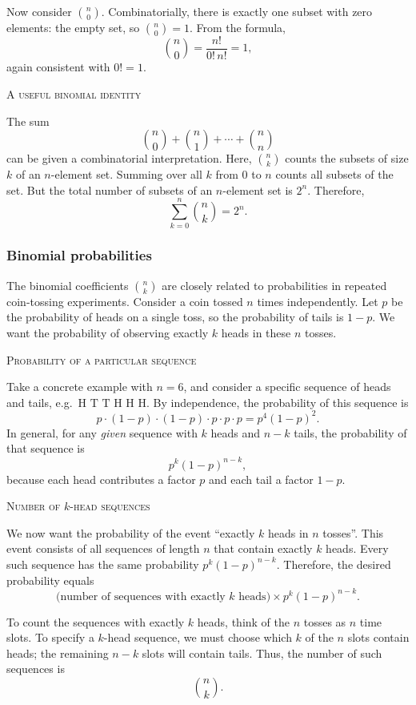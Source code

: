 Now consider \(\binom{n}{0}\).  
Combinatorially, there is exactly one subset with zero elements: the empty set, so \(\binom{n}{0} = 1\).  
From the formula,
\[
\binom{n}{0} = \frac{n!}{0! \, n!} = 1,
\]
again consistent with \(0! = 1\).

\bigskip\textsc{A useful binomial identity}

The sum
\[
\binom{n}{0} + \binom{n}{1} + \cdots + \binom{n}{n}
\]
can be given a combinatorial interpretation.  
Here, \(\binom{n}{k}\) counts the subsets of size \(k\) of an \(n\)-element set.  
Summing over all \(k\) from \(0\) to \(n\) counts all subsets of the set.  
But the total number of subsets of an \(n\)-element set is \(2^n\).  
Therefore,
\[
\sum_{k=0}^{n} \binom{n}{k} = 2^n.
\]


\subsubsection{Binomial probabilities}

The binomial coefficients \(\binom{n}{k}\) are closely related to probabilities in repeated coin-tossing experiments.  
Consider a coin tossed \(n\) times independently.  
Let \(p\) be the probability of heads on a single toss, so the probability of tails is \(1-p\).  
We want the probability of observing exactly \(k\) heads in these \(n\) tosses.

\bigskip\textsc{Probability of a particular sequence}

Take a concrete example with \(n = 6\), and consider a specific sequence of heads and tails, e.g.\ \(\text{H T T H H H}\).  
By independence, the probability of this sequence is
\[
p \cdot (1-p) \cdot (1-p) \cdot p \cdot p \cdot p = p^4 (1-p)^2.
\]
In general, for any \textit{given} sequence with \(k\) heads and \(n-k\) tails, the probability of that sequence is
\[
p^k (1-p)^{n-k},
\]
because each head contributes a factor \(p\) and each tail a factor \(1-p\).

\bigskip\textsc{Number of \(k\)-head sequences}

We now want the probability of the event “exactly \(k\) heads in \(n\) tosses”.  
This event consists of all sequences of length \(n\) that contain exactly \(k\) heads.  
Every such sequence has the same probability \(p^k (1-p)^{n-k}\).  
Therefore, the desired probability equals
\[
\bigl(\text{number of sequences with exactly }k\text{ heads}\bigr) \times p^k (1-p)^{n-k}.
\]

To count the sequences with exactly \(k\) heads, think of the \(n\) tosses as \(n\) time slots.  
To specify a \(k\)-head sequence, we must choose which \(k\) of the \(n\) slots contain heads; the remaining \(n-k\) slots will contain tails.  
Thus, the number of such sequences is
\[
\binom{n}{k}.
\]

